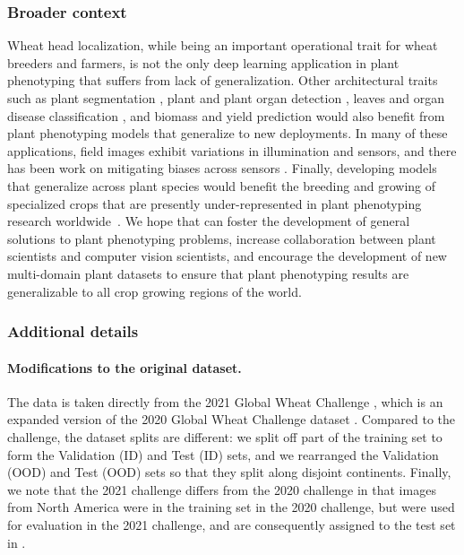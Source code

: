\subsubsection{Broader context}
Wheat head localization, while being an important operational trait for wheat breeders and farmers, is not the only deep learning application in plant phenotyping that suffers from lack of generalization. Other architectural traits such as plant segmentation \citep{sadeghi2017multi, kuznichov2019data}, plant and plant organ detection \citep{fan2018automatic, madec2019ear}, leaves and organ disease classification \citep{fuentes2017robust, shakoor2017high, toda2019convolutional}, and biomass and yield prediction \citep{aich2018deepwheat, dreccer2019yielding} would also benefit from plant phenotyping models that generalize to new deployments. In many of these applications, field images exhibit variations in illumination and sensors, and there has been work on mitigating biases across sensors \citep{ayalew2020unsupervised, gogoll2020unsupervised}. Finally, developing models that generalize across plant species would benefit the breeding and growing of specialized crops that are presently under-represented in plant phenotyping research worldwide~\citep{ward2020scalable}.
We hope that \Wheat can foster the development of general solutions to plant phenotyping problems, increase collaboration between plant scientists and computer vision scientists, and encourage the development of new multi-domain plant datasets to ensure that plant phenotyping results are generalizable to all crop growing regions of the world.

\subsubsection{Additional details}
\paragraph{Modifications to the original dataset.}
The data is taken directly from the 2021 Global Wheat Challenge \citep{david2021global}, which is an expanded version of the 2020 Global Wheat Challenge dataset \citep{david2020global}.
Compared to the challenge, the dataset splits are different:
we split off part of the training set to form the Validation (ID) and Test (ID) sets, and we rearranged the Validation (OOD) and Test (OOD) sets so that they split along disjoint continents.
Finally, we note that the 2021 challenge differs from the 2020 challenge in that images from North America were in the training set in the 2020 challenge, but were used for evaluation in the 2021 challenge, and are consequently assigned to the test set in \Wheat.
